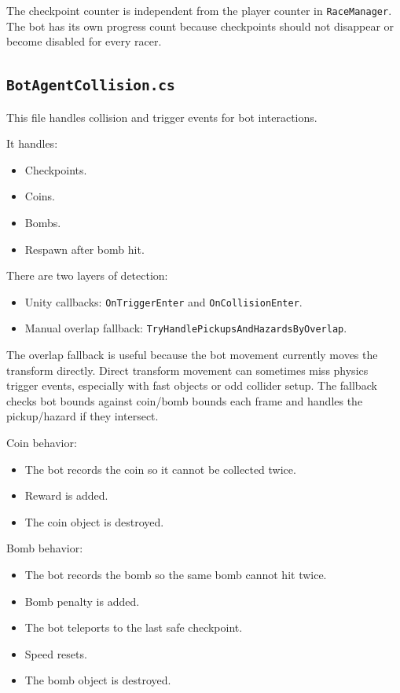 \documentclass[11pt]{article}
\newcommand{\file}[1]{\texttt{#1}}
\newcommand{\code}[1]{{\footnotesize\texttt{#1}}}
\begin{document}
The checkpoint counter is independent from the player counter in \code{RaceManager}. The bot has its own progress count because checkpoints should not disappear or become disabled for every racer.

\subsection{\file{BotAgentCollision.cs}}

This file handles collision and trigger events for bot interactions.

It handles:

\begin{itemize}
    \item Checkpoints.
    \item Coins.
    \item Bombs.
    \item Respawn after bomb hit.
\end{itemize}

There are two layers of detection:

\begin{itemize}
    \item Unity callbacks: \code{OnTriggerEnter} and \code{OnCollisionEnter}.
    \item Manual overlap fallback: \code{TryHandlePickupsAndHazardsByOverlap}.
\end{itemize}

The overlap fallback is useful because the bot movement currently moves the transform directly. Direct transform movement can sometimes miss physics trigger events, especially with fast objects or odd collider setup. The fallback checks bot bounds against coin/bomb bounds each frame and handles the pickup/hazard if they intersect.

Coin behavior:

\begin{itemize}
    \item The bot records the coin so it cannot be collected twice.
    \item Reward is added.
    \item The coin object is destroyed.
\end{itemize}

Bomb behavior:

\begin{itemize}
    \item The bot records the bomb so the same bomb cannot hit twice.
    \item Bomb penalty is added.
    \item The bot teleports to the last safe checkpoint.
    \item Speed resets.
    \item The bomb object is destroyed.
\end{itemize}
\end{document}
